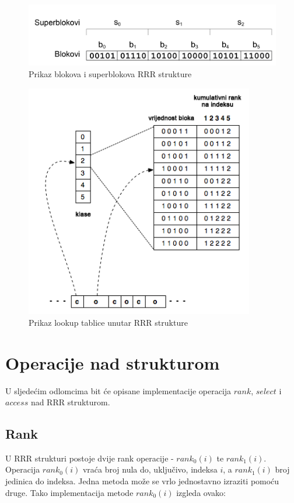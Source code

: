 \documentclass[times, utf8, seminar, numeric]{fer}
\begin{document}
\begin{figure}[ht]
	\centering
	\includegraphics[width=15cm]{img/rrr_blocks.png}
	\caption{Prikaz blokova i superblokova RRR strukture}
	\label{fig:rrr}
\end{figure}

\begin{figure}[ht]
	\centering
	\includegraphics[width=10cm]{img/rrr-binary-table.png}
	\caption{Prikaz lookup tablice unutar RRR strukture}
	\label{fig:lookup}
\end{figure}


\section{Operacije nad strukturom}
U sljedećim odlomcima bit će opisane implementacije operacija $rank$, $select$ i $access$ nad RRR strukturom.


\subsection{Rank}
U RRR strukturi postoje dvije rank operacije - $rank_0(i)$ te $rank_1(i)$. Operacija $rank_0(i)$ vraća broj nula do, uključivo, indeksa $i$, a $rank_1(i)$ broj jedinica do indeksa. 
Jedna metoda može se vrlo jednostavno izraziti pomoću druge. Tako implementacija metode $rank_0(i)$ izgleda ovako:
\end{document}

